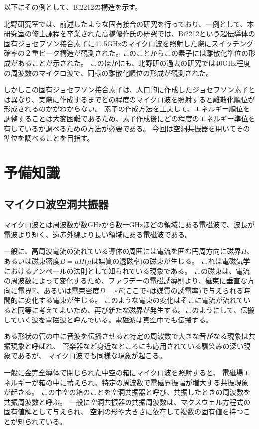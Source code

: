 以下にその例として、Bi2212の構造を示す。\cite{びすます}

北野研究室では、前述したような固有接合の研究を行っており、一例として、本研究室の修士課程を卒業された高橋優作氏の研究\cite{たかはし}では、Bi2212という超伝導体の固有ジョセフソン接合素子に41.5GHzのマイクロ波を照射した際にスイッチング確率の２重ピーク構造が観測された。このことからこの素子には離散化準位の形成があることが示された。
このほかにも、北野研の過去の研究では40GHz程度の周波数のマイクロ波で、同様の離散化順位の形成が観測された。

しかしこの固有ジョセフソン接合素子は、人口的に作成したジョセフソン素子とは異なり、実際に作成するまでどの程度のマイクロ波を照射すると離散化順位が形成されるのかがわからない。
素子の作成方法を工夫して、エネルギー順位を調整することは大変困難であるため、素子作成後にどの程度のエネルギー準位を有しているか調べるための方法が必要である。
今回は空洞共振器を用いてその準位を調べることを目指す。

\section{予備知識}
\subsection{マイクロ波空洞共振器}
マイクロ波とは周波数が数GHzから数十GHzほどの領域にある電磁波で、波長が電波より短く、遠赤外線より長い領域にある電磁波である。

一般に、高周波電流の流れている導体の周囲には電流を囲む円周方向に磁界$H$、あるいは磁束密度$B =μH$($μ$は媒質の透磁率)の磁束が生じる。
これは電磁気学におけるアンペールの法則として知られている現象である。
この磁束は、電流の周波数によって変化するため、ファラデーの電磁誘導則より、磁束に垂直な方向に電界E、あるいは電束密度$D =εE$(ここで$ε$は媒質の誘電率)で与えられる時間的に変化する電束が生じる。
このような電束の変化はそこに電流が流れていると同等に考えてよいため、再び新たな磁界が発生する。このようにして、伝搬していく波を電磁波と呼んでいる。電磁波は真空中でも伝搬する。

ある形状の管の中に音波を伝播させると特定の周波数で大きな音がなる現象は共振現象と呼ばれ、
管楽器など身近なところにも応用されている馴染みの深い現象であるが、
マイクロ波でも同様な現象が起こる。

一般に金完全導体で閉じられた中空の箱にマイクロ波を照射すると、
電磁場エネルギーが箱の中に蓄えられ、特定の周波数で電磁界振幅が増大する共振現象が起きる。
この中空の箱のことを空洞共振器と呼び、共振したときの周波数を共振周波数と呼ぶ。
一般に空洞共振器の共振周波数は、マクスウェル方程式の固有値解として与えられ、
空洞の形や大きさに依存して複数の固有値を持つことが知られている。

